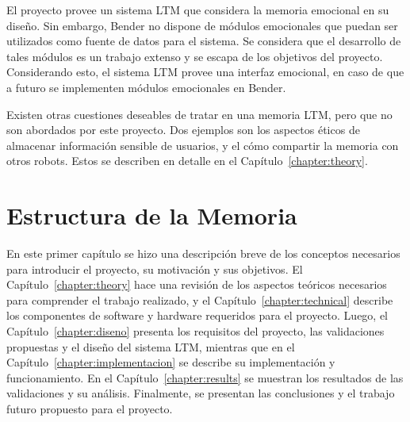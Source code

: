 El proyecto provee un sistema LTM que considera la memoria emocional en su diseño. Sin embargo, Bender no dispone de módulos emocionales que puedan ser utilizados como fuente de datos para el sistema. Se considera que el desarrollo de tales módulos es un trabajo extenso y se escapa de los objetivos del proyecto. Considerando esto, el sistema LTM provee una interfaz emocional, en caso de que a futuro se implementen módulos emocionales en Bender.

Existen otras cuestiones deseables de tratar en una memoria LTM, pero que no son abordados por este proyecto. Dos ejemplos son los aspectos éticos de almacenar información sensible de usuarios, y el cómo compartir la memoria con otros robots. Estos se describen en detalle en el Capítulo~\ref{chapter:theory}.


\section{Estructura de la Memoria}

En este primer capítulo se hizo una descripción breve de los conceptos necesarios para introducir el proyecto, su motivación y sus objetivos. El Capítulo~\ref{chapter:theory} hace una revisión de los aspectos teóricos necesarios para comprender el trabajo realizado, y el Capítulo~\ref{chapter:technical} describe los componentes de software y hardware requeridos para el proyecto. Luego, el Capítulo~\ref{chapter:diseno} presenta los requisitos del proyecto, las validaciones propuestas y el diseño del sistema LTM, mientras que en el Capítulo~\ref{chapter:implementacion} se describe su implementación y funcionamiento. En el Capítulo~\ref{chapter:results} se muestran los resultados de las validaciones y su análisis. Finalmente, se presentan las conclusiones y el trabajo futuro propuesto para el proyecto.




